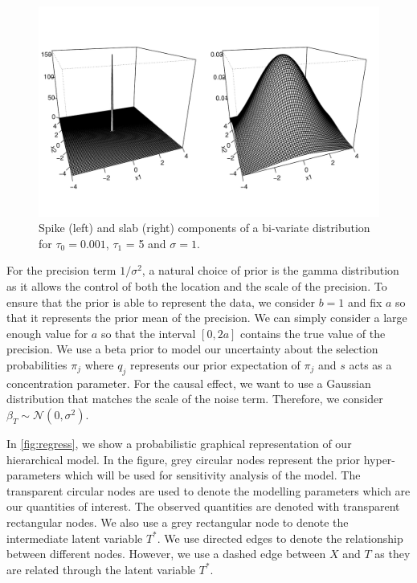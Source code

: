 \documentclass{amsart}
\newcommand{\normal}{\mathcal{N}}
\begin{document}
\begin{figure}[h]
	\begin{center}
		\includegraphics[width = 0.95\linewidth]{spike_slab_bi.pdf}
	\end{center}
	\caption{Spike (left) and slab (right) components of a bi-variate distribution for $\tau_0 = 0.001$, $\tau_1$ = 5 and $\sigma=1$.}
	\label{fig:ssbl}
\end{figure}

For the precision term $1/\sigma^2$, a natural choice of prior is the gamma distribution
as it allows the control of both the location and the scale of the precision.
To ensure that the prior is able to represent the data, we consider $b=1$ and 
fix $a$ so that it represents the prior mean of the precision.
We can simply consider a large enough value for $a$
so that the interval
$[0, 2a]$ contains the true value of the precision.
We use a beta prior to
model our uncertainty about
the selection probabilities $\pi_j$ where  $q_j$ represents our prior expectation of $\pi_j$ and $s$ acts as 
a concentration parameter.
For the causal effect, we want to use a Gaussian distribution that 
matches the scale of the noise term. Therefore, we consider $\beta_T\sim \normal(0,\sigma^2)$. 

In \cref{fig:regress}, we show a probabilistic graphical representation
of our hierarchical model. In the figure, grey circular nodes represent the
prior hyper-parameters which will be used for sensitivity analysis
of the model. The transparent circular nodes are used to denote
the modelling parameters which are our quantities of interest. 
The observed quantities are denoted with transparent rectangular
nodes. We also use a grey rectangular node to denote the intermediate
latent variable $T^*$. We use directed edges to denote the
relationship between different nodes. However, we use a dashed
edge between $X$ and $T$ as they are related through the latent
variable $T^*$. 
\end{document}
